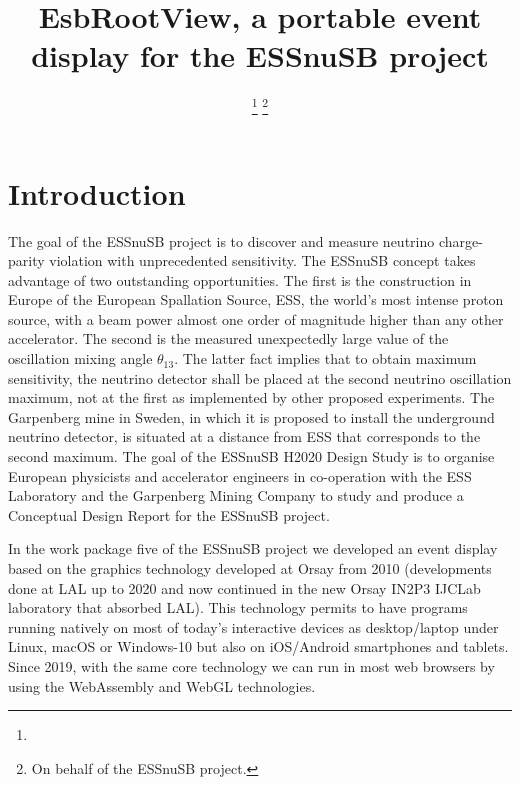 \documentclass{webofc}
\begin{document}
%
\title{EsbRootView, a portable event display for the ESSnuSB project}

\author{
  \fnsep
  \thanks{}
  \fnsep
  \footnote{On behalf of the ESSnuSB project.}
}


%
\maketitle
%
\section{Introduction}
\label{intro}
The goal of the ESSnuSB project \cite{ESSnuSB} is to discover and measure neutrino
charge-parity violation with unprecedented sensitivity. The ESSnuSB
concept takes advantage of two outstanding opportunities. The first is the construction in Europe of the European Spallation
Source, ESS, the world’s most intense proton source, with a beam power
almost one order of magnitude higher than any other accelerator. The
second is the measured unexpectedly large value of the
oscillation mixing angle $\theta_{13}$. The latter fact implies that to obtain maximum sensitivity, the neutrino detector shall be placed at the second neutrino oscillation maximum, not at the first as implemented by other proposed experiments. The Garpenberg mine in Sweden, in which it is proposed to install the underground neutrino detector, is situated at a distance from ESS that corresponds to the second maximum.
The goal of the ESSnuSB H2020 Design Study is to organise European physicists and accelerator engineers in co-operation with the ESS Laboratory and the Garpenberg Mining Company to study and produce a Conceptual Design Report for the ESSnuSB project.

In the work package five of the ESSnuSB project we developed an event display based
on the graphics technology developed at Orsay from 2010 (developments
done at LAL up to 2020 and now continued in the new Orsay IN2P3 IJCLab
laboratory that absorbed LAL).
This technology permits to have programs
running natively on most of today's interactive devices as desktop/laptop under
Linux, macOS or Windows-10 but also on iOS/Android smartphones and
tablets. Since 2019, with the same core technology we can run in most
web browsers by using the WebAssembly and WebGL technologies.
\end{document}
